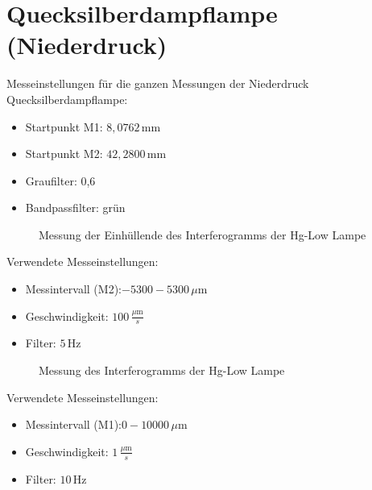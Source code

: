 \section{Quecksilberdampflampe (Niederdruck)}
Messeinstellungen für die ganzen Messungen der Niederdruck Quecksilberdampflampe:
\begin{itemize}
    \item Startpunkt M1: $8,0762\,\text{mm}$
    \item Startpunkt M2: $42,2800\,\text{mm}$
    \item Graufilter: 0,6
    \item Bandpassfilter: grün
\end{itemize}
\begin{figure}[h]
    \centering\scalebox{1.2}{}
    \caption{Messung der Einhüllende des Interferogramms der Hg-Low Lampe}
\end{figure}
Verwendete Messeinstellungen:
\begin{itemize}
    \item Messintervall (M2):$-5300-5300\,\mu\text{m}$
    \item Geschwindigkeit: $100\,\frac{\mu\text{m}}{s}$
    \item Filter: $5\,\text{Hz}$
\end{itemize}\newpage
\begin{figure}[h]
    \centering\scalebox{1.2}{}
    \caption{Messung des Interferogramms der Hg-Low Lampe}
\end{figure}
Verwendete Messeinstellungen:
\begin{itemize}
    \item Messintervall (M1):$0-10000\,\mu\text{m}$
    \item Geschwindigkeit: $1\,\frac{\mu\text{m}}{s}$
    \item Filter: $10\,\text{Hz}$
\end{itemize}